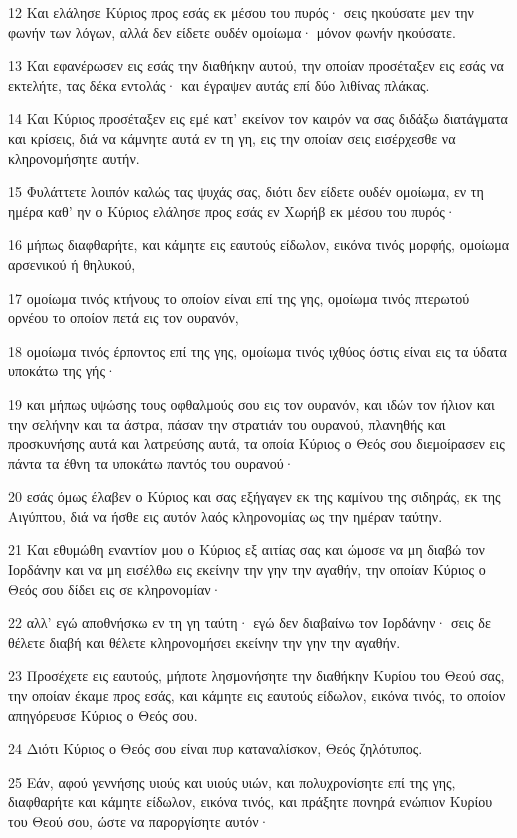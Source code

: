 \par 12 Και ελάλησε Κύριος προς εσάς εκ μέσου του πυρός· σεις ηκούσατε μεν την φωνήν των λόγων, αλλά δεν είδετε ουδέν ομοίωμα· μόνον φωνήν ηκούσατε.
\par 13 Και εφανέρωσεν εις εσάς την διαθήκην αυτού, την οποίαν προσέταξεν εις εσάς να εκτελήτε, τας δέκα εντολάς· και έγραψεν αυτάς επί δύο λιθίνας πλάκας.
\par 14 Και Κύριος προσέταξεν εις εμέ κατ' εκείνον τον καιρόν να σας διδάξω διατάγματα και κρίσεις, διά να κάμνητε αυτά εν τη γη, εις την οποίαν σεις εισέρχεσθε να κληρονομήσητε αυτήν.
\par 15 Φυλάττετε λοιπόν καλώς τας ψυχάς σας, διότι δεν είδετε ουδέν ομοίωμα, εν τη ημέρα καθ' ην ο Κύριος ελάλησε προς εσάς εν Χωρήβ εκ μέσου του πυρός·
\par 16 μήπως διαφθαρήτε, και κάμητε εις εαυτούς είδωλον, εικόνα τινός μορφής, ομοίωμα αρσενικού ή θηλυκού,
\par 17 ομοίωμα τινός κτήνους το οποίον είναι επί της γης, ομοίωμα τινός πτερωτού ορνέου το οποίον πετά εις τον ουρανόν,
\par 18 ομοίωμα τινός έρποντος επί της γης, ομοίωμα τινός ιχθύος όστις είναι εις τα ύδατα υποκάτω της γής·
\par 19 και μήπως υψώσης τους οφθαλμούς σου εις τον ουρανόν, και ιδών τον ήλιον και την σελήνην και τα άστρα, πάσαν την στρατιάν του ουρανού, πλανηθής και προσκυνήσης αυτά και λατρεύσης αυτά, τα οποία Κύριος ο Θεός σου διεμοίρασεν εις πάντα τα έθνη τα υποκάτω παντός του ουρανού·
\par 20 εσάς όμως έλαβεν ο Κύριος και σας εξήγαγεν εκ της καμίνου της σιδηράς, εκ της Αιγύπτου, διά να ήσθε εις αυτόν λαός κληρονομίας ως την ημέραν ταύτην.
\par 21 Και εθυμώθη εναντίον μου ο Κύριος εξ αιτίας σας και ώμοσε να μη διαβώ τον Ιορδάνην και να μη εισέλθω εις εκείνην την γην την αγαθήν, την οποίαν Κύριος ο Θεός σου δίδει εις σε κληρονομίαν·
\par 22 αλλ' εγώ αποθνήσκω εν τη γη ταύτη· εγώ δεν διαβαίνω τον Ιορδάνην· σεις δε θέλετε διαβή και θέλετε κληρονομήσει εκείνην την γην την αγαθήν.
\par 23 Προσέχετε εις εαυτούς, μήποτε λησμονήσητε την διαθήκην Κυρίου του Θεού σας, την οποίαν έκαμε προς εσάς, και κάμητε εις εαυτούς είδωλον, εικόνα τινός, το οποίον απηγόρευσε Κύριος ο Θεός σου.
\par 24 Διότι Κύριος ο Θεός σου είναι πυρ καταναλίσκον, Θεός ζηλότυπος.
\par 25 Εάν, αφού γεννήσης υιούς και υιούς υιών, και πολυχρονίσητε επί της γης, διαφθαρήτε και κάμητε είδωλον, εικόνα τινός, και πράξητε πονηρά ενώπιον Κυρίου του Θεού σου, ώστε να παροργίσητε αυτόν·

